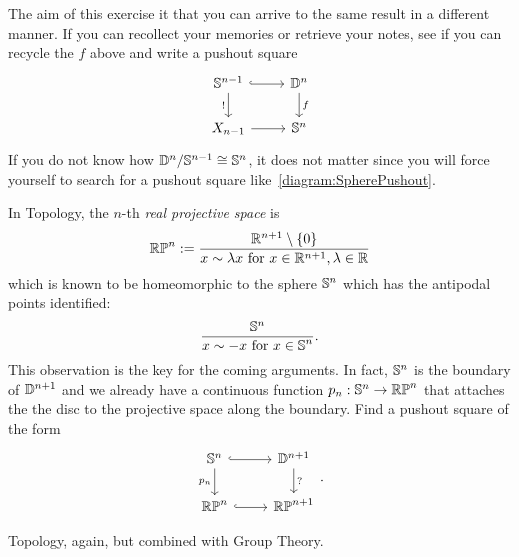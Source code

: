 \begin{exercise}
The aim of this exercise it that you can arrive to the same result in a different manner. If you can recollect your memories or retrieve your notes, see if you can recycle the \(f\) above and write a pushout square
\begin{equation}\begin{tikzcd}
\sph^{n-1} \ar[hookrightarrow, r] \ar["!", d, swap] & \dsc^n \ar["f", d] \\
X_{n-1} \ar[r] & \sph^n
\end{tikzcd}\label{diagram:SpherePushout}\end{equation}
If you do not know how \({\mathbb D^n}{/}{\mathbb S^{n-1}} \cong \mathbb S^n\), it does not matter since you will force yourself to search for a pushout square like~\eqref{diagram:SpherePushout}.
\end{exercise}

\begin{exercise}
In Topology, the \(n\)-th {\em real projective space} is
\[\mathbb{RP}^n := \frac{\mathbb R^{n+1} \setminus \left\{0\right\}}{x \sim \lambda x \text{ for } x \in \mathbb R^{n+1}, \lambda \in \mathbb R}\]
which is known to be homeomorphic to the sphere \(\mathbb S^n\) which has the antipodal points identified:
\[\frac{\mathbb S^n}{\displaystyle x \sim - x \text{ for } x \in \mathbb S^n} .\]
This observation is the key for the coming arguments. In fact, \(\mathbb S^n\) is the boundary of \(\mathbb D^{n+1}\) and we already have a continuous function \(p_n : \mathbb S^n \to \mathbb{RP}^n\) that attaches the the disc to the projective space along the boundary. Find a pushout square of the form
\[\begin{tikzcd}
\sph^n \ar[hookrightarrow, r] \ar["p_n", d, swap] & \dsc^{n+1} \ar["?", d] \\
\rpspc^n \ar[r, hookrightarrow] & \rpspc^{n+1}
\end{tikzcd}.\]
\end{exercise}

Topology, again, but combined with Group Theory.

